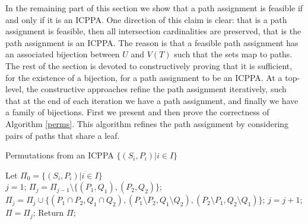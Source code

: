 \documentclass{llncs}
\begin{document}
\noindent
In the remaining part of this section we show that a path assignment is feasible if and only if
it is an ICPPA.  One direction of this claim is clear: that is a path assignment is feasible, then all
intersection cardinalities are preserved, that is the path assignment is an ICPPA.  The reason is that a
feasible path assignment has an associated bijection between $U$ and $V(T)$ such that the sets
map to paths.  The rest of the section is devoted to constructively proving that it is sufficient, for the existence of a bijection, for a path
assignment to be an ICPPA.  At a top-level, the constructive approaches refine the path assignment iteratively, such that at the end of each iteration we have a path assignment, and finally we have a family of bijections.
First we present and then prove the
  correctness of Algorithm \ref{perms}.  This algorithm refines the path assignment by considering pairs of paths that share a leaf.  

\begin{algorithm}[h]
\caption{Permutations from an ICPPA $\{(S_i,P_i) | i \in I\}$}
\label{perms}
\begin{algorithmic}
\STATE Let $\Pi_0=\{(S_i,P_i)| i \in I\}$\\
\STATE $j = 1$;
\label{shareleaf} 
\STATE $\Pi_j=   \Pi_{j-1} \setminus \{(P_1,Q_1),(P_2,Q_2)\}$;
\label{setbreak}\STATE $\Pi_j = \Pi_j \cup \{(P_1 \cap P_2,Q_1 \cap Q_2), (P_1 \setminus P_2,Q_1 \setminus Q_2), (P_2 \setminus P_1, Q_2 \setminus Q_1)\}$;
\STATE $j = j+1$;
\ENDWHILE
\STATE $\Pi = \Pi_j$;
\STATE Return $\Pi$;
\end{algorithmic}
\end{algorithm}
\end{document}
